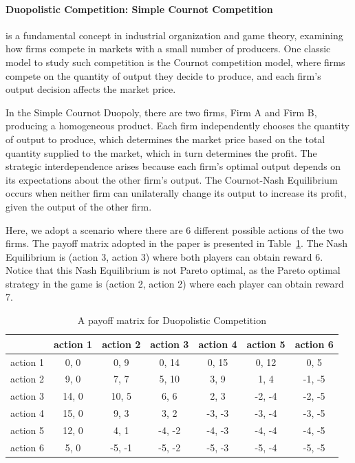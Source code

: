 \paragraph{Duopolistic Competition: Simple Cournot Competition}
is a fundamental concept in industrial organization and game theory, examining how firms compete in markets with a small number of producers. One classic model to study such competition is the Cournot competition model, where firms compete on the quantity of output they decide to produce, and each firm's output decision affects the market price.

In the Simple Cournot Duopoly, there are two firms, Firm A and Firm B, producing a homogeneous product. Each firm independently chooses the quantity of output to produce, which determines the market price based on the total quantity supplied to the market, which in turn determines the profit. The strategic interdependence arises because each firm's optimal output depends on its expectations about the other firm's output. The Cournot-Nash Equilibrium occurs when neither firm can unilaterally change its output to increase its profit, given the output of the other firm.

Here, we adopt a scenario where there are 6 different possible actions of the two firms. The payoff matrix adopted in the paper is presented in Table~\ref{payoff:DC}. The Nash Equilibrium is (action 3, action 3) where both players can obtain reward 6. Notice that this Nash Equilibrium is not Pareto optimal, as the Pareto optimal strategy in the game is (action 2, action 2) where each player can obtain reward 7.

\begin{table}[htb]%
\centering
    \begin{tabular}{l|cccccc}
         & action 1 & action 2 & action 3 & action 4 & action 5 & action 6 \\
        \toprule
        action 1 & \phantom{1}0, 0 & \phantom{-1}0, \phantom{-}9 & \phantom{-}0, 14 & \phantom{-}0, 15 & \phantom{-}0, 12 & \phantom{-}0, \phantom{-}5 \\
        action 2 & \phantom{1}9, 0 & \phantom{-1}7, \phantom{-}7 & \phantom{-}5, 10 & \phantom{-}3, \phantom{-}9 & \phantom{-}1, \phantom{-}4 & -1, -5  \\
        action 3 & 14, 0 & \phantom{-}10, \phantom{-}5 & \phantom{-}6, \phantom{-}6 & \phantom{-}2, \phantom{-}3 & -2, -4 & -2, -5  \\
        action 4 & 15, 0 & \phantom{-1}9, \phantom{-}3 & \phantom{-}3, \phantom{-}2 & -3, -3 & -3, -4 & -3, -5  \\
        action 5 & 12, 0 & \phantom{-1}4, \phantom{-}1 & -4, -2 & -4, -3 & -4, -4 & -4, -5 \\
        action 6 & \phantom{1}5, 0 & \phantom{1}-5, -1 & -5, -2 & -5, -3 & -5, -4 & -5, -5 \\
    \end{tabular}
    \vspace{5pt}
    \caption{A payoff matrix for Duopolistic Competition}
    \label{payoff:DC}
\end{table}



